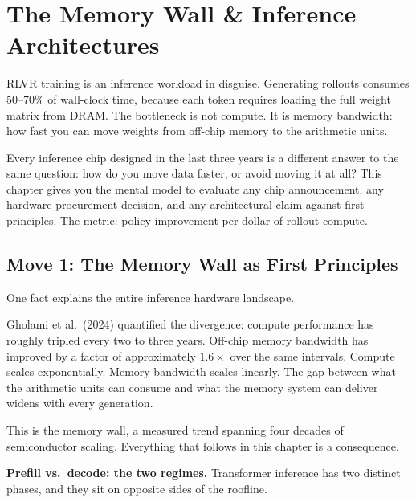 \section*{The Memory Wall \& Inference Architectures}

\smallskip

\begin{whythis}
RLVR training is an inference workload in disguise. Generating rollouts consumes 50--70\% of wall-clock time, because each token requires loading the full weight matrix from DRAM. The bottleneck is not compute. It is memory bandwidth: how fast you can move weights from off-chip memory to the arithmetic units.

Every inference chip designed in the last three years is a different answer to the same question: how do you move data faster, or avoid moving it at all? This chapter gives you the mental model to evaluate any chip announcement, any hardware procurement decision, and any architectural claim against first principles. The metric: policy improvement per dollar of rollout compute.
\end{whythis}

\subsection*{Move 1: The Memory Wall as First Principles}

One fact explains the entire inference hardware landscape.

Gholami et al.\ (2024) quantified the divergence: compute performance has roughly tripled every two to three years. Off-chip memory bandwidth has improved by a factor of approximately $1.6\times$ over the same intervals. Compute scales exponentially. Memory bandwidth scales linearly. The gap between what the arithmetic units can consume and what the memory system can deliver widens with every generation.

This is the memory wall, a measured trend spanning four decades of semiconductor scaling. Everything that follows in this chapter is a consequence.

\textbf{Prefill vs.\ decode: the two regimes.} Transformer inference has two distinct phases, and they sit on opposite sides of the roofline.

